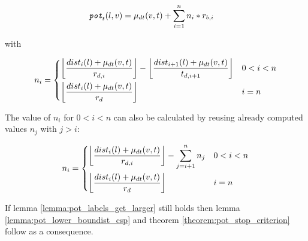 \begin{align}\label{eq:multiple_breaks_pot}
	\concretepotential_t(l,v) & = \drivingtime(v,t) + \sum_{i=1}^n{ n_i * \restr_{b,i}}
\end{align}

with

\begin{align}\label{eq:number_breaks}
	n_i =\begin{dcases}
		\floor*{ \frac{dist_{i}(l) + \drivingtime(v,t)}{\restr_{d,i}} } - \floor*{ \frac{dist_{i+1}(l) + \drivingtime(v,t)}{t_{d,i+1}} } & 0 < i < n \\
		\floor*{ \frac{dist_{i}(l) + \drivingtime(v,t)}{\restr_d} }                                                                      & i=n
	\end{dcases}
\end{align}

The value of $n_i$ for $0 < i < n$ can also be calculated by reusing already computed values $n_j$ with $j > i$:

\begin{align*}
	n_i =\begin{dcases}
		\floor*{ \frac{dist_{i}(l) + \drivingtime(v,t)}{\restr_{d,i}} } - \sum_{j=i+1}^{n}{n_{j} } & 0 < i < n \\
		\floor*{ \frac{dist_{i}(l) + \drivingtime(v,t)}{\restr_d} }                                & i=n
	\end{dcases}
\end{align*}

If lemma \ref{lemma:pot_labels_get_larger} still holds then lemma \ref{lemma:pot_lower_boundist_csp} and theorem \ref{theorem:pot_stop_criterion} follow as a consequence.



